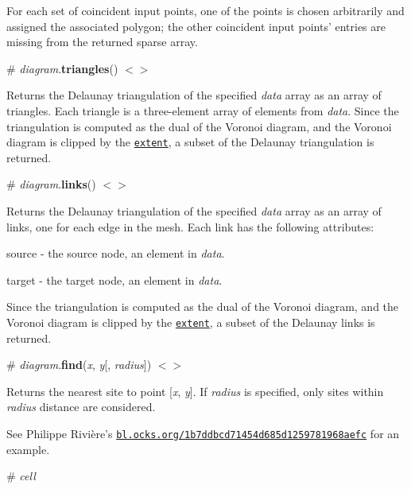 For each set of coincident input points, one of the points is chosen arbitrarily and assigned the associated polygon; the other coincident input points’ entries are missing from the returned sparse array.

\label{_diagram_triangles}%
\# {\itshape diagram}.{\bfseries triangles}() \href{https://github.com/d3/d3-voronoi/blob/master/src/Diagram.js#L82}{\tt $<$$>$}

Returns the Delaunay triangulation of the specified {\itshape data} array as an array of triangles. Each triangle is a three-\/element array of elements from {\itshape data}. Since the triangulation is computed as the dual of the Voronoi diagram, and the Voronoi diagram is clipped by the \href{#voronoi_extent}{\tt extent}, a subset of the Delaunay triangulation is returned.

\label{_diagram_links}%
\# {\itshape diagram}.{\bfseries links}() \href{https://github.com/d3/d3-voronoi/blob/master/src/Diagram.js#L108}{\tt $<$$>$}

Returns the Delaunay triangulation of the specified {\itshape data} array as an array of links, one for each edge in the mesh. Each link has the following attributes\+:


\begin{DoxyItemize}
\item {\ttfamily source} -\/ the source node, an element in {\itshape data}.
\item {\ttfamily target} -\/ the target node, an element in {\itshape data}.
\end{DoxyItemize}

Since the triangulation is computed as the dual of the Voronoi diagram, and the Voronoi diagram is clipped by the \href{#voronoi_extent}{\tt extent}, a subset of the Delaunay links is returned.

\label{_diagram_find}%
\# {\itshape diagram}.{\bfseries find}({\itshape x}, {\itshape y}\mbox{[}, {\itshape radius}\mbox{]}) \href{https://github.com/d3/d3-voronoi/blob/master/src/Diagram.js#L119}{\tt $<$$>$}

Returns the nearest site to point \mbox{[}{\itshape x}, {\itshape y}\mbox{]}. If {\itshape radius} is specified, only sites within {\itshape radius} distance are considered.

See Philippe Rivière’s \href{http://bl.ocks.org/Fil/1b7ddbcd71454d685d1259781968aefc}{\tt bl.\+ocks.\+org/1b7ddbcd71454d685d1259781968aefc} for an example.

\label{_cell}%
\# {\itshape cell}

